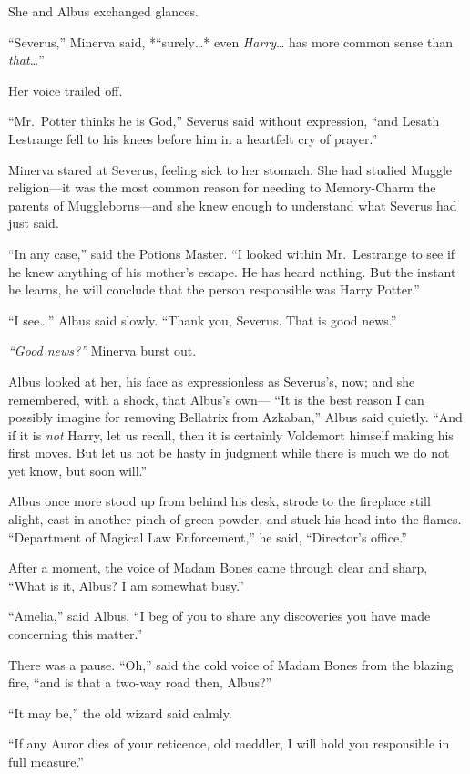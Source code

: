 She and Albus exchanged glances.

``Severus,'' Minerva said, *``surely\ldots{}* even \emph{Harry}\ldots{}
has more common sense than \emph{that\ldots{}}''

Her voice trailed off.

``Mr.~Potter thinks he is God,'' Severus said without expression, ``and
Lesath Lestrange fell to his knees before him in a heartfelt cry of
prayer.''

Minerva stared at Severus, feeling sick to her stomach. She had studied
Muggle religion---it was the most common reason for needing to
Memory-Charm the parents of Muggleborns---and she knew enough to
understand what Severus had just said.

``In any case,'' said the Potions Master. ``I looked within
Mr.~Lestrange to see if he knew anything of his mother's escape. He has
heard nothing. But the instant he learns, he will conclude that the
person responsible was Harry Potter.''

``I see\ldots{}'' Albus said slowly. ``Thank you, Severus. That is good
news.''

\emph{``Good news?''} Minerva burst out.

Albus looked at her, his face as expressionless as Severus's, now; and
she remembered, with a shock, that Albus's own--- ``It is the best
reason I can possibly imagine for removing Bellatrix from Azkaban,''
Albus said quietly. ``And if it is \emph{not} Harry, let us recall, then
it is certainly Voldemort himself making his first moves. But let us not
be hasty in judgment while there is much we do not yet know, but soon
will.''

Albus once more stood up from behind his desk, strode to the fireplace
still alight, cast in another pinch of green powder, and stuck his head
into the flames. ``Department of Magical Law Enforcement,'' he said,
``Director's office.''

After a moment, the voice of Madam Bones came through clear and sharp,
``What is it, Albus? I am somewhat busy.''

``Amelia,'' said Albus, ``I beg of you to share any discoveries you have
made concerning this matter.''

There was a pause. ``Oh,'' said the cold voice of Madam Bones from the
blazing fire, ``and is that a two-way road then, Albus?''

``It may be,'' the old wizard said calmly.

``If any Auror dies of your reticence, old meddler, I will hold you
responsible in full measure.''

